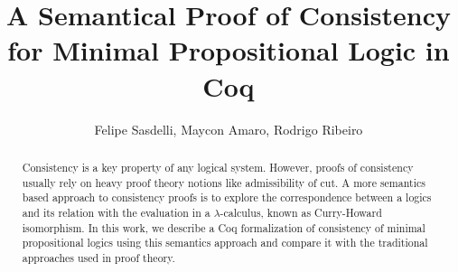\documentclass[12pt]{article}
\title{A Semantical Proof of Consistency for Minimal Propositional Logic in Coq}
\author{Felipe Sasdelli\inst{1}, Maycon Amaro\inst{1}, Rodrigo Ribeiro\inst{1}}
\begin{document}
 

\maketitle

\begin{abstract}
  Consistency is a key property of any logical system. However, proofs of
  consistency usually rely on heavy proof theory notions like admissibility
  of cut. A more semantics based approach to consistency proofs is to explore the
  correspondence between a logics and its relation with the
  evaluation in a $\lambda$-calculus, known as Curry-Howard isomorphism.
  In this work, we describe a Coq formalization of consistency of minimal
  propositional logics using this semantics approach and compare it with 
  the traditional approaches used in proof theory.
\end{abstract}






\end{document}
